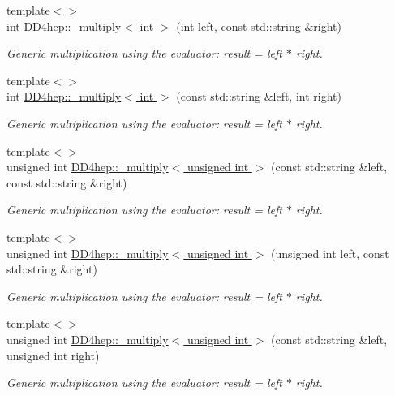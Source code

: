 \begin{DoxyCompactItemize}
{\footnotesize template$<$$>$ }\\int \hyperlink{group___d_d4_h_e_p___g_e_o_m_e_t_r_y_ga31026088d902a9f41a08ff29f894d2c7}{D\+D4hep\+::\+\_\+multiply$<$ int $>$} (int left, const std\+::string \&right)
\begin{DoxyCompactList}\small\item\em Generic multiplication using the evaluator\+: result = left $\ast$ right. \end{DoxyCompactList}\item 
{\footnotesize template$<$$>$ }\\int \hyperlink{group___d_d4_h_e_p___g_e_o_m_e_t_r_y_ga8892475189fdc3f4871942f860df0a48}{D\+D4hep\+::\+\_\+multiply$<$ int $>$} (const std\+::string \&left, int right)
\begin{DoxyCompactList}\small\item\em Generic multiplication using the evaluator\+: result = left $\ast$ right. \end{DoxyCompactList}\item 
{\footnotesize template$<$$>$ }\\unsigned int \hyperlink{group___d_d4_h_e_p___g_e_o_m_e_t_r_y_gadadc5362c0b144ed5f567870a1319542}{D\+D4hep\+::\+\_\+multiply$<$ unsigned int $>$} (const std\+::string \&left, const std\+::string \&right)
\begin{DoxyCompactList}\small\item\em Generic multiplication using the evaluator\+: result = left $\ast$ right. \end{DoxyCompactList}\item 
{\footnotesize template$<$$>$ }\\unsigned int \hyperlink{group___d_d4_h_e_p___g_e_o_m_e_t_r_y_gabf5e7c3cd63e84fef4d9267494b78659}{D\+D4hep\+::\+\_\+multiply$<$ unsigned int $>$} (unsigned int left, const std\+::string \&right)
\begin{DoxyCompactList}\small\item\em Generic multiplication using the evaluator\+: result = left $\ast$ right. \end{DoxyCompactList}\item 
{\footnotesize template$<$$>$ }\\unsigned int \hyperlink{group___d_d4_h_e_p___g_e_o_m_e_t_r_y_ga0f69e380254943f59b1e3830a3437b4d}{D\+D4hep\+::\+\_\+multiply$<$ unsigned int $>$} (const std\+::string \&left, unsigned int right)
\begin{DoxyCompactList}\small\item\em Generic multiplication using the evaluator\+: result = left $\ast$ right. \end{DoxyCompactList}\item 

\end{DoxyCompactItemize}
